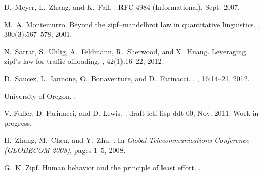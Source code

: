 \documentclass[twocolumn, 10pt]{article}
\theoremstyle{plain}
\begin{document}
\begin{thebibliography}{10}
D.~Meyer, L.~Zhang, and K.~Fall.
.
\newblock RFC 4984 (Informational), Sept. 2007.

M.~A. Montemurro.
\newblock Beyond the zipf--mandelbrot law in quantitative linguistics.
,
  300(3):567--578, 2001.

N.~Sarrar, S.~Uhlig, A.~Feldmann, R.~Sherwood, and X.~Huang.
\newblock Leveraging zipf's law for traffic offloading.
, 42(1):16--22, 2012.

D.~Saucez, L.~Iannone, O.~Bonaventure, and D.~Farinacci.
.
, 16:14--21, 2012.

{University of Oregon}.
.

{V. Fuller, D. Farinacci, and D. Lewis}.
.
\newblock draft-ietf-lisp-ddt-00, Nov. 2011.
\newblock Work in progress.

H.~Zhang, M.~Chen, and Y.~Zhu.
.
\newblock In {\em Global Telecommunications Conference (GLOBECOM 2008)}, pages
  1--5, 2008.

G.~K. Zipf.
\newblock Human behavior and the principle of least effort.
.

\end{thebibliography}
\normalsize
\end{document}
